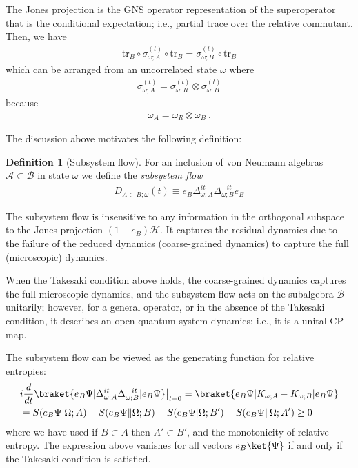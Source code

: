 \documentclass[a4paper,11pt]{article}
\theoremstyle{definition}
\newtheorem{definition}{Definition}[section]
\newcommand{\mA}{\mathcal{A}}
\newcommand{\mB}{\mathcal{B}}
\newcommand{\nn}{\nonumber}
\newcommand{\mH}{\mathcal{H}}
\newcommand{\tr}{\text{tr}}
\begin{document}
The Jones projection is the GNS operator representation of the superoperator that is the conditional expectation; i.e., partial trace over the relative commutant. Then, we have
\begin{align}
    \tr_B\circ \sigma_{\omega;A}^{(t)}\circ \tr_B=\sigma_{\omega;B}^{(t)}\circ \tr_B
\end{align}
which can be arranged from an uncorrelated state $\omega$ where
\begin{align}
\sigma^{(t)}_{\omega;A}=\sigma^{(t)}_{\omega;R}\otimes \sigma^{(t)}_{\omega;B}
\end{align}
because 
\begin{align}
    \omega_A=\omega_R\otimes \omega_B\ .
\end{align}

The discussion above motivates the following definition:
\begin{definition}[Subsystem flow]
   For an inclusion of von Neumann algebras $\mA\subset \mB$ in state $\omega$ we define the {\it subsystem flow}
\begin{align}
    D_{A\subset B;\omega}(t)\equiv e_B\Delta_{\omega;A}^{it}\Delta_{\omega;B}^{-it}e_B
\end{align}
\end{definition}
The subsystem flow is insensitive to any information in the orthogonal subspace to the Jones projection $(1-e_B)\mH$. It captures the residual dynamics due to the failure of the reduced dynamics (coarse-grained dynamics) to capture the full (microscopic) dynamics.

When the Takesaki condition above holds, the coarse-grained dynamics captures the full microscopic dynamics, and the subsystem flow acts on the subalgebra $\mB$ unitarily; however, for a general operator, or in the absence of the Takesaki condition, it describes an open quantum system dynamics; i.e., it is a unital CP map. 

The subsystem flow can be viewed as the generating function for relative entropies:
\begin{align}
    &i\frac{d}{dt}\braket{e_B\Psi|\Delta_{\omega;A}^{it}\Delta_{\omega;B}^{-it}|e_B\Psi}\big|_{t=0}=\braket{e_B\Psi|K_{\omega;A}-K_{\omega;B}|e_B\Psi}\nn\\
    &=S(e_B\Psi|\Omega;A)-S(e_B\Psi\|\Omega;B)+S(e_B\Psi|\Omega;B')-S(e_B\Psi\|\Omega;A') \geq 0
\end{align}
where we have used if $B\subset A$ then $A'\subset B'$, and the monotonicity of relative entropy. The expression above vanishes for all vectors $e_B\ket{\Psi}$ if and only if the Takesaki condition is satisfied. 
\end{document}
